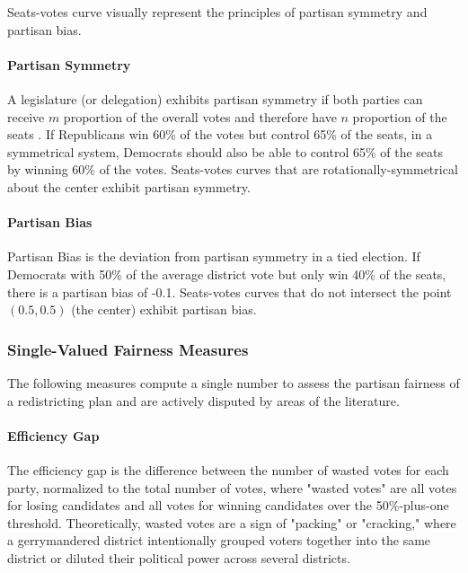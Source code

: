 Seats-votes curve visually represent the principles of partisan symmetry and partisan bias.

\paragraph{Partisan Symmetry}

A legislature (or delegation) exhibits partisan symmetry if both parties can receive $m$ proportion of the overall votes and therefore have $n$ proportion of the seats \parencite{katz2020}. If Republicans win 60\% of the votes but control 65\% of the seats, in a symmetrical system, Democrats should also be able to control 65\% of the seats by winning 60\% of the votes. Seats-votes curves that are rotationally-symmetrical about the center exhibit partisan symmetry.

\paragraph{Partisan Bias}
\label{sec:bias}

Partisan Bias is the deviation from partisan symmetry in a tied election. If Democrats with 50\% of the average district vote but only win 40\% of the seats, there is a partisan bias of -0.1. Seats-votes curves that do not intersect the point $(0.5, 0.5)$ (the center) exhibit partisan bias.

\subsubsection{Single-Valued Fairness Measures}

The following measures compute a single number to assess the partisan fairness of a redistricting plan and are actively disputed by areas of the literature.

\paragraph{Efficiency Gap}
\label{sec:effgap}

The efficiency gap is the difference between the number of wasted votes for each party, normalized to the total number of votes, where "wasted votes" are all votes for losing candidates and all votes for winning candidates over the 50\%-plus-one threshold. Theoretically, wasted votes are a sign of "packing" or "cracking," where a gerrymandered district intentionally grouped voters together into the same district or diluted their political power across several districts. \parencite{stephanopoulos2014}

